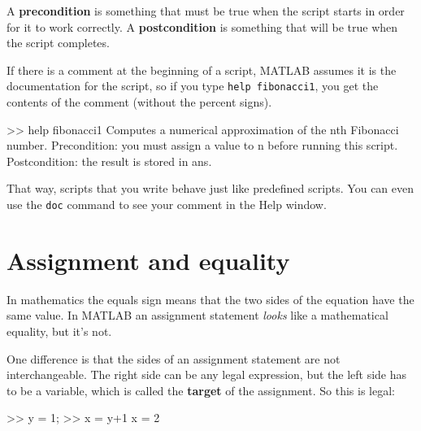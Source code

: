 \documentclass[
]{book}
\numberwithin{Answer}{chapter}
\numberwithin{Exercise}{chapter}
\begin{document}

\begin{code}
\end{code}

A {\bf precondition} is something that must be true when the script
starts in order for it to work correctly.  A {\bf postcondition}
is something that will be true when the script completes.


If there is a comment at the beginning of a script, MATLAB assumes
it is the documentation for the script, so if you type {\tt help
fibonacci1}, you get the contents of the comment (without the percent
signs).

\begin{code}
>> help fibonacci1
  Computes a numerical approximation of the nth Fibonacci number.  
  Precondition: you must assign a value to n before running this script.
  Postcondition: the result is stored in ans.
\end{code}

That way, scripts that you write behave just like predefined scripts.
You can even use the {\tt doc} command to see your comment in the
{\sf Help} window.




\section{Assignment and equality}


In mathematics the equals sign means that the two sides of the
equation have the same value.  In MATLAB an assignment statement
{\em looks} like a mathematical equality, but it's not.

One difference is that the sides of an assignment statement are not
interchangeable.  The right side can be any legal expression, but
the left side has to be a variable, which is called the 
{\bf target} of the assignment.  So this is legal:

\begin{code}
>> y = 1;
>> x = y+1
x = 2
\end{code}
\end{document}
